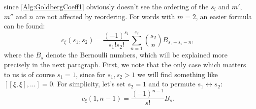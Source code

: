 since \eqref{Alg:GoldbergCoeff1} obviously doesn't see the ordering of the 
$s_i$ and $m'$, $m''$ and $n$ are not affected by reordering. For words with 
$m = 2$, an easier formula can be found:
\begin{equation*}
	c_{\xi}(s_1, s_2) 
	= 
	\frac{ (-1)^{s_1} }{s_1! s_2!} 
	\sum\limits_{n = 1}^{s_2} 
	\binom{s_2}{n} B_{s_1 + s_2 - n},
\end{equation*}
where the $B_s$ denote the Bernoulli numbers, which will be explained more 
precisely in the next paragraph. First, we note that the only case which 
matters to us is of course $s_1 = 1$, since for $s_1, s_2 > 1$ we will find 
something like $[[\xi, \xi], \ldots ] = 0$. For simplicity, let's set 
$s_2 = 1$ and to permute $s_1 \leftrightarrow s_2$:
\begin{equation}
	\label{Alg:GoldbergCoeffBernoulli}
	c_{\xi}(1, n-1)
	=
	\frac{ (-1)^{n-1} }{s!}
	B_s.
\end{equation}


